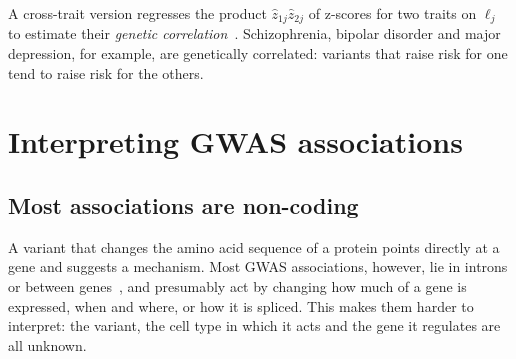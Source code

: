 A cross-trait version regresses the product $\hat z_{1j}\hat z_{2j}$ of z-scores for two traits on $\ell_j$ to estimate their \emph{genetic correlation}~\citep{bulik2015b}. Schizophrenia, bipolar disorder and major depression, for example, are genetically correlated: variants that raise risk for one tend to raise risk for the others.

\section{Interpreting GWAS associations}
\label{sec:interpret}

\subsection{Most associations are non-coding}

A variant that changes the amino acid sequence of a protein points directly at a gene and suggests a mechanism. Most GWAS associations, however, lie in introns or between genes~\citep{hindorff2009}, and presumably act by changing how much of a gene is expressed, when and where, or how it is spliced. This makes them harder to interpret: the variant, the cell type in which it acts and the gene it regulates are all unknown.

